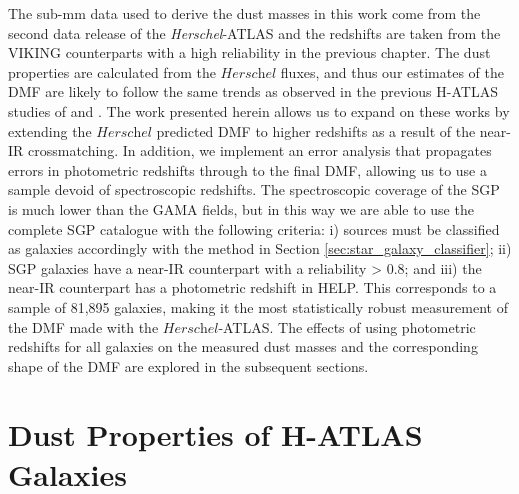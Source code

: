 The sub-mm data used to derive the dust masses in this work come from the second data release of the \textit{Herschel}-ATLAS and the redshifts are taken from the VIKING counterparts with a high reliability in the previous chapter. The dust properties are calculated from the $\textit{Herschel}$ fluxes, and thus our estimates of the DMF are likely to follow the same trends as observed in the previous H-ATLAS studies of \citealt{Dunne_2011} and \citealt{Beeston_2018}. The work presented herein allows us to expand on these works by extending the $\textit{Herschel}$ predicted DMF to higher redshifts as a result of the near-IR crossmatching. In addition, we implement an error analysis that propagates errors in photometric redshifts through to the final DMF, allowing us to use a sample devoid of spectroscopic redshifts. The spectroscopic coverage of the SGP is much lower than the GAMA fields, but in this way we are able to use the complete SGP catalogue with the following criteria: i) sources must be classified as galaxies accordingly with the method in Section \ref{sec:star_galaxy_classifier}; ii) SGP galaxies have a near-IR counterpart with a reliability > 0.8; and iii) the near-IR counterpart has a photometric redshift in HELP. This corresponds to a sample of 81,895 galaxies, making it the most statistically robust measurement of the DMF made with the $\textit{Herschel}$-ATLAS. The effects of using photometric redshifts for all galaxies on the measured dust masses and the corresponding shape of the DMF are explored in the subsequent sections.

\section{Dust Properties of H-ATLAS Galaxies}

